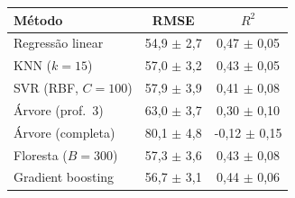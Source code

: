\begin{tabular}{@{}lcc@{}}
\toprule
Método & RMSE & $R^2$ \\
\midrule
Regressão linear & 54,9 $\pm$ 2,7 & 0,47 $\pm$ 0,05 \\
KNN ($k=15$) & 57,0 $\pm$ 3,2 & 0,43 $\pm$ 0,05 \\
SVR (RBF, $C=100$) & 57,9 $\pm$ 3,9 & 0,41 $\pm$ 0,08 \\
Árvore (prof.\ 3) & 63,0 $\pm$ 3,7 & 0,30 $\pm$ 0,10 \\
Árvore (completa) & 80,1 $\pm$ 4,8 & -0,12 $\pm$ 0,15 \\
Floresta ($B=300$) & 57,3 $\pm$ 3,6 & 0,43 $\pm$ 0,08 \\
Gradient boosting & 56,7 $\pm$ 3,1 & 0,44 $\pm$ 0,06 \\
\bottomrule
\end{tabular}
